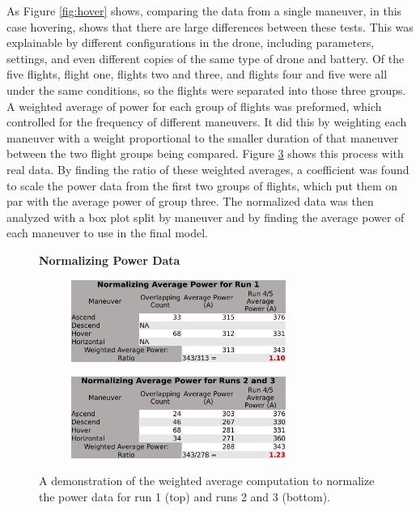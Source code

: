 \documentclass{article}
\begin{document}
As Figure \ref{fig:hover} shows, comparing the data from a single maneuver, in this case hovering, shows that there are large differences between these tests. This was explainable by different configurations in the drone, including parameters, settings, and even different copies of the same type of drone and battery. Of the five flights, flight one, flights two and three, and flights four and five were all under the same conditions, so the flights were separated into those three groups. A weighted average of power for each group of flights was preformed, which controlled for the frequency of different maneuvers. It did this by weighting each maneuver with a weight proportional to the smaller duration of that maneuver between the two flight groups being compared. Figure  \ref{fig:Norm} shows this process with real data. By finding the ratio of these weighted averages, a coefficient was found to scale the power data from the first two groups of flights, which put them on par with the average power of group three. The normalized data was then analyzed with a box plot split by maneuver and by finding the average power of each maneuver to use in the final model.\par

\begin{figure}
\centering
\large{\textbf{Normalizing Power Data}}\par
\begin{subfigure}[b]{0.5\textwidth}
  \centering
   \includegraphics[width=70mm]{images/Normalizing1.png}
  \label{fig:sub1}
\end{subfigure}
\begin{subfigure}[b]{0.5\textwidth}
  \centering
  \includegraphics[width=70mm]{images/Normalizing2.png}
  \label{fig:sub2}
\end{subfigure}
\caption{A demonstration of the weighted average computation to normalize the power data for run 1 (top) and runs 2 and 3 (bottom).}
\label{fig:Norm}
\end{figure}
\end{document}
